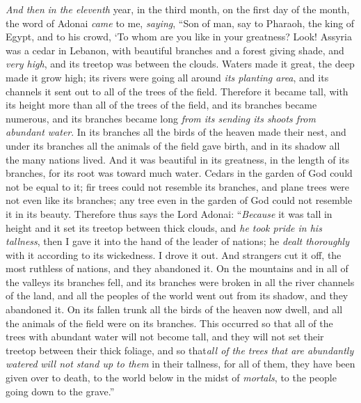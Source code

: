 \begin{biblechapter} %
 \textit{And then} \textit{in the eleventh} year, in the third month, on the first day of the month, the word of Adonai \textit{came} to me, \textit{saying},
\verse “Son of man, say to Pharaoh, the king of Egypt, and to his crowd,
\verse ‘To whom are you like in your greatness?
\verse Look! Assyria was a cedar in Lebanon, 
with beautiful branches and a forest giving shade, 
and \textit{very high}, 
and its treetop was between the clouds.
\verse Waters made it great, 
the deep made it grow high; 
its rivers were going all around \textit{its planting area}, 
and its channels it sent out 
to all of the trees of the field.
\verse Therefore it became tall, 
with its height more than all of the trees of the field, 
and its branches became numerous, 
and its branches became long 
\textit{from its sending its shoots from abundant water}.
\verse In its branches all the birds of the heaven made their nest, 
and under its branches all the animals of the field gave birth, 
and in its shadow all the many nations lived.
\verse And it was beautiful in its greatness, 
in the length of its branches, 
for its root was toward much water.
\verse Cedars in the garden of God 
could not be equal to it; 
fir trees could not resemble its branches, 
and plane trees were not even like its branches; 
any tree even in the garden of God 
could not resemble it in its beauty.
\verse Therefore thus says the Lord Adonai: “\textit{Because} it was tall in height and it set its treetop between thick clouds, and \textit{he took pride in his tallness},
\verse then I gave it into the hand of the leader of nations; he \textit{dealt thoroughly} with it according to its wickedness. I drove it out.
\verse And strangers cut it off, the most ruthless of nations, and they abandoned it. On the mountains and in all of the valleys its branches fell, and its branches were broken in all the river channels of the land, and all the peoples of the world went out from its shadow, and they abandoned it.
\verse On its fallen trunk all the birds of the heaven now dwell, and all the animals of the field were on its branches.
\verse This occurred so that all of the trees with abundant water will not become tall, and they will not set their treetop between their thick foliage, and so that\textit{all of the trees that are abundantly watered} \textit{will not stand up to them} in their tallness, for all of them, they have been given over to death, to the world below in the midst of \textit{mortals}, to the people going down to the grave.”

\end{biblechapter}
